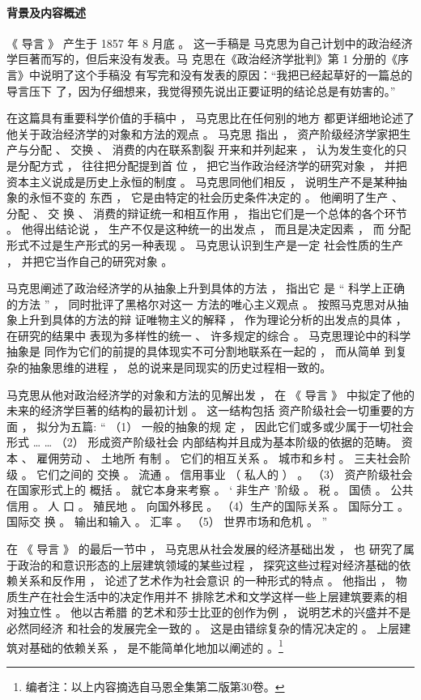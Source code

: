 \documentclass[a4paper,twoside,12pt,AutoFakeBold]{ctexart}
\begin{document}
\paragraph{背景及内容概述}\begin{fangsong}
《 导言 》 产生于 1857 年 8 月底 。 这一手稿是
马克思为自己计划中的政治经济学巨著而写的，但后来没有发表。马
克思在《政治经济学批判》第 1 分册的《序言》中说明了这个手稿没
有写完和没有发表的原因：“我把已经起草好的一篇总的导言压下
了，因为仔细想来，我觉得预先说出正要证明的结论总是有妨害的。”

在这篇具有重要科学价值的手稿中 ， 马克思比在任何别的地方
都更详细地论述了他关于政治经济学的对象和方法的观点 。 马克思
指出 ， 资产阶级经济学家把生产与分配 、 交换 、 消费的内在联系割裂
开来和并列起来 ， 认为发生变化的只是分配方式 ， 往往把分配提到首
位 ， 把它当作政治经济学的研究对象 ， 并把资本主义说成是历史上永恒的制度 。 马克思同他们相反 ， 说明生产不是某种抽象的永恒不变的
东西 ， 它是由特定的社会历史条件决定的 。 他阐明了生产 、 分配 、 交
换 、 消费的辩证统一和相互作用 ， 指出它们是一个总体的各个环节 。
他得出结论说 ， 生产不仅是这种统一的出发点 ， 而且是决定因素 ， 而
分配形式不过是生产形式的另一种表现 。 马克思认识到生产是一定
社会性质的生产 ， 并把它当作自己的研究对象 。

马克思阐述了政治经济学的从抽象上升到具体的方法 ， 指出它
是 “ 科学上正确的方法 ” ， 同时批评了黑格尔对这一
方法的唯心主义观点 。 按照马克思对从抽象上升到具体的方法的辩
证唯物主义的解释 ， 作为理论分析的出发点的具体 ， 在研究的结果中
表现为多样性的统一 、 许多规定的综合 。 马克思理论中的科学抽象是
同作为它们的前提的具体现实不可分割地联系在一起的 ， 而从简单
到复杂的抽象思维的进程 ， 总的说来是同现实的历史过程相一致的。

马克思从他对政治经济学的对象和方法的见解出发 ， 在 《 导言 》
中拟定了他的未来的经济学巨著的结构的最初计划 。 这一结构包括
资产阶级社会一切重要的方面 ， 拟分为五篇: “ （1） 一般的抽象的规
定 ， 因此它们或多或少属于一切社会形式 … … （2） 形成资产阶级社会
内部结构并且成为基本阶级的依据的范畴。 资本 、 雇佣劳动 、 土地所
有制 。 它们的相互关系 。 城市和乡村 。 三夫社会阶级 。 它们之间的
交换 。 流通 。 信用事业 （ 私人的 ） 。 （3） 资产阶级社会在国家形式上的
概括 。 就它本身来考察 。 ‘ 非生产 ’阶级 。 税 。 国债 。 公共信用 。 人
口 。 殖民地 。 向国外移民 。 （4）生产的国际关系 。 国际分工 。 国际交
换 。 输出和输入 。 汇率 。 （5） 世界市场和危机 。 ”

在 《 导言 》 的最后一节中 ， 马克思从社会发展的经济基础出发 ， 也
研究了属于政治的和意识形态的上层建筑领域的某些过程 ， 探究这些过程对经济基础的依赖关系和反作用 ， 论述了艺术作为社会意识
的一种形式的特点 。 他指出 ， 物质生产在社会生活中的决定作用并不
排除艺术和文学这样一些上层建筑要素的相对独立性 。 他以古希腊
的艺术和莎士比亚的创作为例 ， 说明艺术的兴盛并不是必然同经济
和社会的发展完全一致的 。 这是由错综复杂的情况决定的 。 上层建
筑对基础的依赖关系 ， 是不能简单化地加以阐述的 。\footnote{编者注：以上内容摘选自马恩全集第二版第30卷。}
\end{fangsong}
\end{document}
